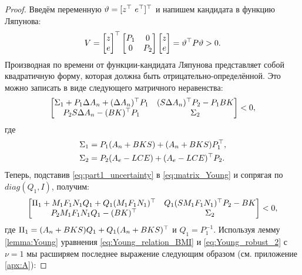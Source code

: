 \begin{proof}
	Введём переменную ${\vartheta}=[
	z^\top \ e^\top ]^\top$ и напишем кандидата в функцию Ляпунова: 
	\begin{equation}
		V
		=
		\begin{bmatrix}
			z \\ e
		\end{bmatrix}^\top
		\begin{bmatrix}
			{P}_1 & 0 \\
			0 & {P}_2
		\end{bmatrix}
		\begin{bmatrix}
			z  \\ e
		\end{bmatrix}
		=
		\vartheta^\top{P}\vartheta
		>0.
	\end{equation}
	Производная по времени от функции-кандидата Ляпунова представляет собой квадратичную форму, которая должна быть отрицательно-определённой. Это можно записать в виде следующего матричного неравенства:
	\begin{equation}
		\label{eq:matrix_Young}
		\begin{bmatrix}
			{\Sigma}_1+{P}_1\Delta {A}_n+ (\Delta {A}_n)^\top {P}_1 & ({S} \Delta {A}_n)^\top{P}_2 -{P}_1{BK} \\
			{P}_2{S}\Delta {A}_n - ({BK})^\top{P}_1 & {\Sigma}_2
		\end{bmatrix}<0,
	\end{equation}
	где
	\begin{align}
		{\Sigma}_1&= {P}_1({A}_n+{BKS})+({A}_n+{BKS}){P}_1^\top, \\  
		{\Sigma}_2&={P}_2({A}_e-{LCE})+({A}_e-{LCE})^\top{P}_2.
	\end{align}
	Теперь, подставив \eqref{eq:part1_uncertainty} в \eqref{eq:matrix_Young} и сопрягая по $diag({Q}_1, {I})$, получим:
	\begin{equation}
		\label{eq:Young_conjugated}
		\begin{bmatrix}
			{\Pi}_1+{M}_1{F}_1{N}_1{Q}_1 + {Q}_1({M}_1{F}_1{N}_1)^\top   & {Q}_1({S} {M}_1{F}_1{N}_1)^\top{P}_2 -{BK} \\
			{P}_2{M}_1{F}_1{N}_1{Q}_1 - ({BK})^\top & {\Sigma}_2
		\end{bmatrix} <0,
	\end{equation}
	где $ {\Pi}_1=({A}_n+{BKS}){Q}_1+{Q}_1({A}_n+{BKS})^\top$ и ${Q}_1 ={P}_1^{-1}$.
	Используя лемму \ref{lemma:Young} уравнения \eqref{eq:Young_relation_BMI} и \eqref{eq:Young_robust_2} с $\nu=1$ мы расширяем последнее выражение следующим образом (см. приложение \ref{apx:A}):

\end{proof}
